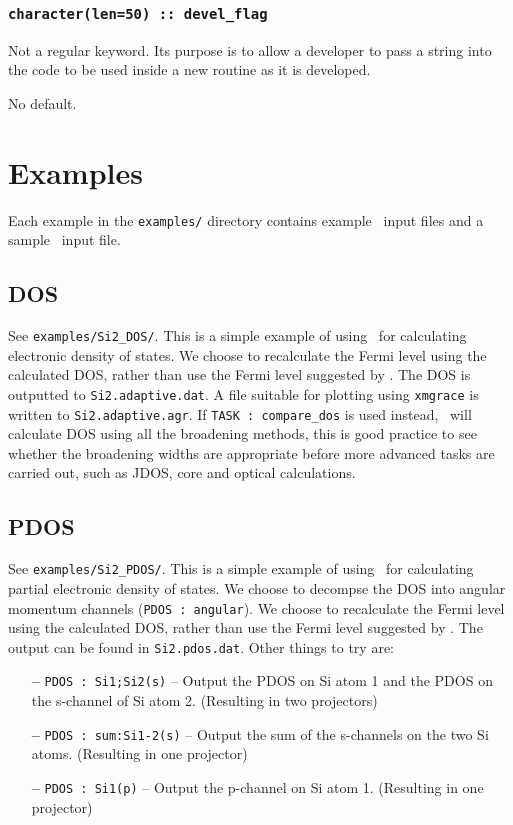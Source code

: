 \documentclass[a4paper,11pt,twoside]{book}
\begin{document}
\subsection[devel\_flag]{\tt character(len=50) :: devel\_flag}

Not a regular keyword. Its purpose is to allow a developer to pass a
string into the code to be used inside a new routine as it is developed.

No default.



\chapter{Examples}

Each example in the \verb#examples/# directory contains example \castep\ input files and a sample \optados\ input file.
\section{DOS}
See  \verb#examples/Si2_DOS/#.  This is a simple example of using \optados\ for calculating electronic density of states.  We choose to recalculate the Fermi level using the calculated DOS, rather than use the Fermi level suggested by \castep. The DOS is outputted to {\tt Si2.adaptive.dat}. A file suitable for plotting using {\tt xmgrace} is written to {\tt Si2.adaptive.agr}.  If {\tt TASK : compare\_dos} is used instead, \optados\ will calculate DOS using all the broadening methods, this is good practice to see whether the broadening widths are appropriate before more advanced tasks are carried out, such as JDOS, core and optical calculations.

\section{PDOS}
See  \verb#examples/Si2_PDOS/#. This is a simple example of using \optados\ for calculating partial electronic density of states. We choose to decompse the DOS into angular momentum channels ({\tt PDOS : angular}). We choose to recalculate the Fermi level using the calculated DOS, rather than use the Fermi level suggested by \castep.  The output can be found in {\tt Si2.pdos.dat}. Other things to try are:
\begin{itemize}
\item[{\bf --}]  \verb#PDOS : Si1;Si2(s)#  -- Output the PDOS on Si atom 1 and the PDOS on the s-channel of Si atom 2. (Resulting in two projectors)
\item[{\bf --}]  \verb#PDOS : sum:Si1-2(s)#  --  Output the sum of the s-channels on the two Si atoms. (Resulting in one projector)
\item[{\bf --}]  \verb#PDOS : Si1(p)# -- Output the p-channel on Si atom 1. (Resulting in one projector)
\end{itemize}
\end{document}
